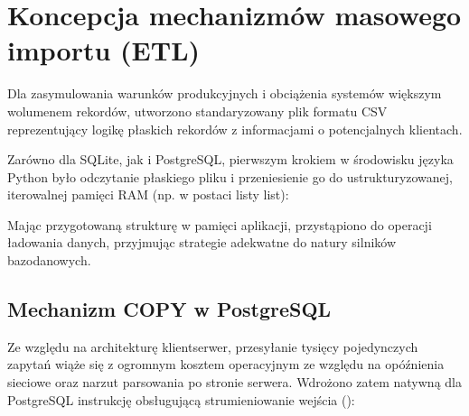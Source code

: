 \documentclass[a4paper,11pt,english,openany,oneside]{sphinxmanual}
\begin{document}
\section{Koncepcja mechanizmów masowego importu (ETL)}
\label{\detokenize{rozdzial_4/index:koncepcja-mechanizmow-masowego-importu-etl}}
\sphinxAtStartPar
Dla zasymulowania warunków produkcyjnych i obciążenia systemów większym wolumenem rekordów, utworzono standaryzowany plik formatu CSV reprezentujący logikę płaskich rekordów z informacjami o potencjalnych klientach.

\sphinxAtStartPar
Zarówno dla SQLite, jak i PostgreSQL, pierwszym krokiem w środowisku języka Python było odczytanie płaskiego pliku i przeniesienie go do ustrukturyzowanej, iterowalnej pamięci RAM (np. w postaci listy list):

\begin{sphinxVerbatim}[commandchars=\\\{\}]

     
      
     
      \PYG{p}{[}    \PYG{p}{]}
\end{sphinxVerbatim}

\sphinxAtStartPar
Mając przygotowaną strukturę w pamięci aplikacji, przystąpiono do operacji ładowania danych, przyjmując strategie adekwatne do natury silników bazodanowych.


\subsection{Mechanizm COPY w PostgreSQL}
\label{\detokenize{rozdzial_4/index:mechanizm-copy-w-postgresql}}
\sphinxAtStartPar
Ze względu na architekturę klient\sphinxhyphen{}serwer, przesyłanie tysięcy pojedynczych zapytań  wiąże się z ogromnym kosztem operacyjnym ze względu na opóźnienia sieciowe oraz narzut parsowania po stronie serwera. Wdrożono zatem natywną dla PostgreSQL instrukcję  obsługującą strumieniowanie wejścia ():
\end{document}
